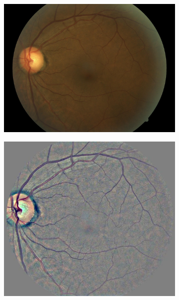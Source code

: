 \begin{figure}[tb]
     \begin{subfigure}[b]{0.24\textwidth}
         \centering
         \includegraphics[width=\textwidth, height=\textwidth]{figures/chapter4/Preprocessing/Ori/36_left.jpeg}
    \end{subfigure}
    \hfill
    \begin{subfigure}[b]{0.24\textwidth}
         \centering
         \includegraphics[width=\textwidth, height=\textwidth]{figures/chapter4/Preprocessing/Prep/36_left_prepr.jpeg}

\end{subfigure}
\end{figure}
